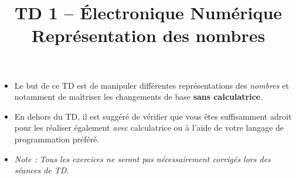 \documentclass[a4paper,11pt]{article}
\title{\textcolor{primary}{\Huge\bfseries TD 1 -- Électronique Numérique}\\[0.5em] \Large Représentation des nombres}
\author{}
\date{}
\begin{document}
\maketitle
\vspace{-2em}

\begin{notebox}
\begin{itemize}
    \item Le but de ce TD est de manipuler différentes représentations des \textit{nombres} et notamment de maîtriser les changements de base \textbf{sans calculatrice}.
    \item En dehors du TD, il est suggéré de vérifier que vous êtes suffisamment adroit pour les réaliser également \textit{avec} calculatrice ou à l'aide de votre langage de programmation préféré.
    \item \textit{Note : Tous les exercices ne seront pas nécessairement corrigés lors des séances de TD.}
\end{itemize}
\end{notebox}

\vspace{1em}
\end{document}
